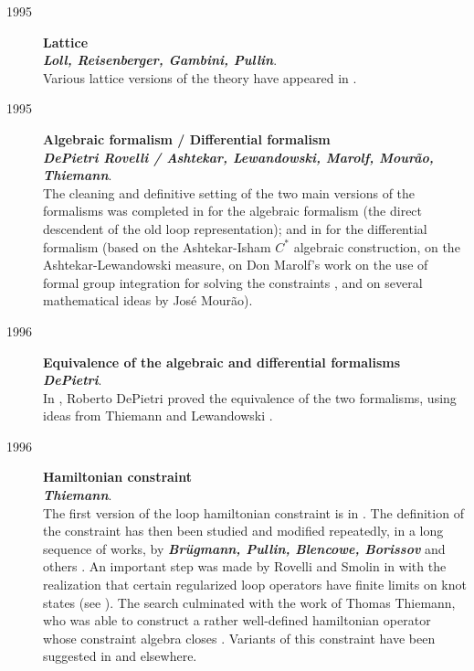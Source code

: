 \begin{description}
	\item[1995] {\bf  Lattice\\
	{\em Loll, Reisenberger, Gambini, Pullin}}.\\
	Various lattice versions of the theory have appeared in 
	\cite{Loll95a,Reisenberger,GambiniPullin,GambiniLattice}.

	\item[1995] {\bf Algebraic formalism / Differential 
	formalism\\
	{\em DePietri Rovelli / Ashtekar, Lewandowski, Marolf, 
	Mour\~{a}o, Thiemann}}.\\
	The cleaning and definitive setting of the two main versions of 
	the formalisms was completed in \cite{DePietriRovelli} for the 
	algebraic formalism (the direct descendent of the old loop 
	representation); and in \cite{AshtekarEtAl95} for the differential 
	formalism (based on the Ashtekar-Isham $C^{*}$ algebraic 
	construction, on the Ashtekar-Lewandowski measure, on Don Marolf's 
	work on the use of formal group integration for solving the 
	constraints \cite{MarolfGroup,MarolfGroup2,MarolfGroup3}, and on 
	several mathematical ideas by Jos\'{e} Mour\~ao).
	
	\item[1996] {\bf Equivalence of the algebraic and 
	differential formalisms\\
	{\em DePietri}}.\\ 
	In \cite{DePietri}, Roberto DePietri proved the equivalence 
	of the two formalisms, using ideas from Thiemann 
	\cite{Thiemann95} and Lewandowski \cite{Lewandowski97}.

	\item[1996] {\bf Hamiltonian constraint\\
	{\em Thiemann}}.\\
	The first version of the loop hamiltonian constraint is in 
	\cite{RovelliSmolin88,RovelliSmolin90}.  The definition of 
	the constraint has then been studied and modified repeatedly, 
	in a long sequence of works, by \textbf{\em Br\"ugmann, 
	Pullin, Blencowe, Borissov} and others 
	\cite{H1,H2,H3,H4,H5,H6,H7,H8,H9}.  An important step was 
	made by Rovelli and Smolin in \cite{RovelliSmolin94} with the 
	realization that certain regularized loop operators have 
	finite limits on knot states (see \cite{LewandowskiMarolf}).  
	The search culminated with the work of Thomas Thiemann, who 
	was able to construct a rather well-defined hamiltonian 
	operator whose constraint algebra closes 
	\cite{Thiemann96,Thiemann96b,Thiemann96c}.  Variants of this 
	constraint have been suggested in 
	\cite{Smolin96,ReisenbergerRovelli} and elsewhere.


\end{description}

